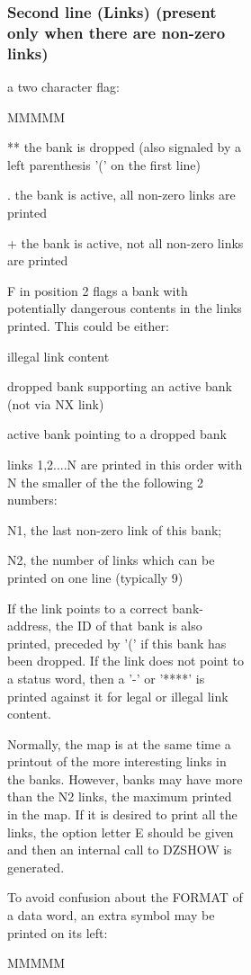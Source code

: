 \begin{figure}
\begin{figure}
\begin{figure}
\subsubsection{Second line (Links) (present only when there are non-zero links)}
\begin{OL}
\item a two character flag:
\begin{DL}{MMMMM}
\item[**
]the bank is dropped (also signaled by a left parenthesis '('
on the first line)
\item[.
]the bank is active, all non-zero links are printed
\item[+
]the bank is active, not all non-zero links are printed
\item[F
]in position 2 flags a bank with potentially dangerous
contents in the links printed. This could be either:
\begin{UL}
\item illegal link content
\item dropped bank supporting an active bank (not via NX link)
\item active bank pointing to a dropped bank
\end{UL}
\end{DL}
\item links 1,2....N are printed in this order with N the smaller of the
the following 2 numbers:
\begin{UL}
\item N1, the last non-zero link of this bank;
\item N2, the number of links which can be printed on one line (typically 9)
\end{UL}
If the link points to a correct bank-address, the ID of that
bank is also printed, preceded by '(' if this bank has been dropped.
If the link does not point to a status word, then a '-' or
'****' is printed against it for legal or illegal link content.
\end{OL}
\par Normally, the map is at the same time a printout of the more
interesting links in the banks.
However, banks may have more than the N2 links,
the maximum printed in the map.
If it is desired to print all the links,
the option letter E should be given and
then an internal  call to DZSHOW is generated.
\par To avoid confusion about the FORMAT of a data word,
an extra symbol may be printed on its left:
\begin{DL}{MMMMM}

\end{DL}
\end{figure}
\end{figure}
\end{figure}
